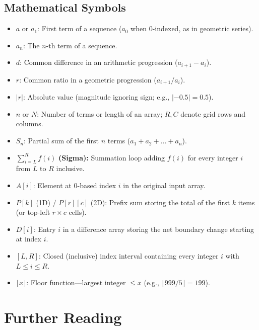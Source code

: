 \documentclass[11pt,a4paper]{article}
\theoremstyle{definition}
\begin{document}
\subsection*{Mathematical Symbols}
\begin{itemize}[itemsep=0pt, topsep=1pt, parsep=0pt]
    \item $a$ or $a_1$: First term of a sequence ($a_0$ when 0-indexed, as in geometric series).
    \item $a_n$: The $n$-th term of a sequence.
    \item $d$: Common difference in an arithmetic progression ($a_{i+1} - a_i$).
    \item $r$: Common ratio in a geometric progression ($a_{i+1} / a_i$).
    \item $|r|$: Absolute value (magnitude ignoring sign; e.g., $|-0.5| = 0.5$).
    \item $n$ or $N$: Number of terms or length of an array; $R, C$ denote grid rows and columns.
    \item $S_n$: Partial sum of the first $n$ terms ($a_1 + a_2 + \dots + a_n$).
    \item $\sum_{i=L}^{R} f(i)$ \textbf{(Sigma):} Summation loop adding $f(i)$ for every integer $i$ from $L$ to $R$ inclusive.
    \item $A[i]$: Element at 0-based index $i$ in the original input array.
    \item $P[k]$ (1D) / $P[r][c]$ (2D): Prefix sum storing the total of the first $k$ items (or top-left $r \times c$ cells).
    \item $D[i]$: Entry $i$ in a difference array storing the net boundary change starting at index $i$.
    \item $[L, R]$: Closed (inclusive) index interval containing every integer $i$ with $L \le i \le R$.
    \item $\lfloor x \rfloor$: Floor function---largest integer $\le x$ (e.g., $\lfloor 999 / 5 \rfloor = 199$).
\end{itemize}

\section{Further Reading}
\end{document}
